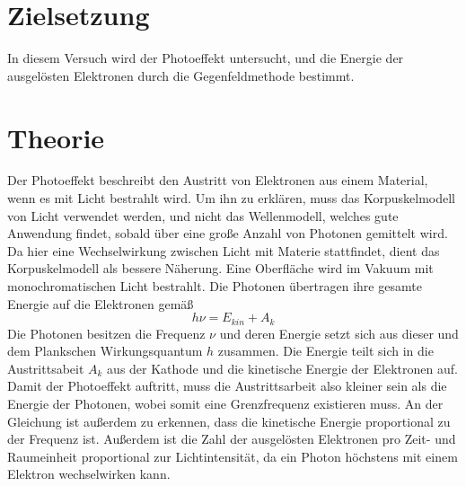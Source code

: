 \section{Zielsetzung}
\label{sec:Zielsetzung}
In diesem Versuch wird der Photoeffekt untersucht, und die Energie der ausgelösten Elektronen durch die Gegenfeldmethode bestimmt.
\section{Theorie}
\label{sec:Theorie}

Der Photoeffekt beschreibt den Austritt von Elektronen aus einem Material, wenn es mit Licht bestrahlt wird. 
Um ihn zu erklären, muss das Korpuskelmodell von Licht verwendet werden, und nicht das Wellenmodell, welches gute Anwendung findet, sobald über eine große Anzahl von Photonen gemittelt wird. Da hier eine Wechselwirkung zwischen Licht mit Materie stattfindet, dient das Korpuskelmodell als bessere Näherung. Eine Oberfläche wird im Vakuum mit monochromatischen Licht bestrahlt. Die Photonen übertragen ihre gesamte Energie auf die Elektronen gemäß
\begin{equation}
h \nu = E_{kin} + A_k
\end{equation}
Die Photonen besitzen die Frequenz $\nu$ und deren Energie setzt sich aus dieser und dem Plankschen Wirkungsquantum $h$ zusammen. Die Energie teilt sich in die Austrittsabeit $A_k$ aus der Kathode und die kinetische Energie der Elektronen auf. 
Damit der Photoeffekt auftritt, muss die Austrittsarbeit also kleiner sein als die Energie der Photonen, wobei somit eine Grenzfrequenz existieren muss. 
An der Gleichung ist außerdem zu erkennen, dass die kinetische Energie proportional zu der Frequenz ist.
Außerdem ist die Zahl der ausgelösten Elektronen pro Zeit- und Raumeinheit proportional zur Lichtintensität, da ein Photon höchstens mit einem Elektron wechselwirken kann.

